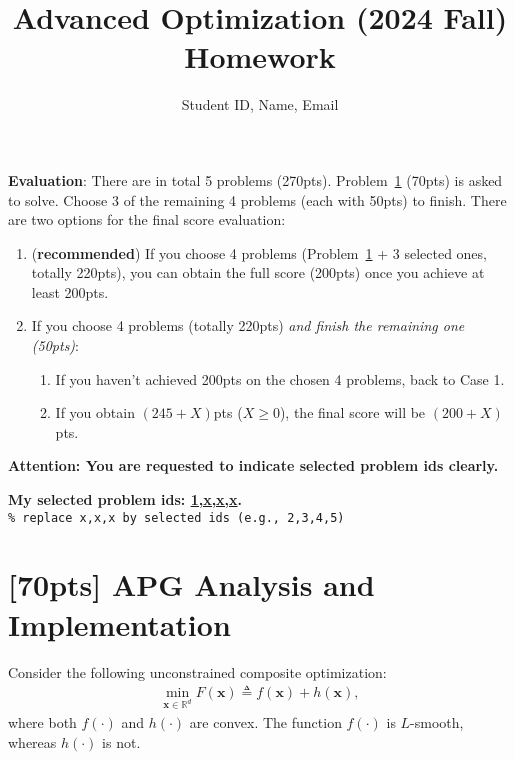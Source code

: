 \documentclass[a4paper]{article}
\numberwithin{equation}{section}
\theoremstyle{definition}
\theoremstyle{definition}
\def \x {\textbf{x}}
\newcommand\mychoice[1]{\textbf{My selected problem ids: \underline{1,#1}.}}
\begin{document}
\title{\textbf{Advanced Optimization (2024 Fall)\\
Homework}}
\author{Student ID, Name, Email}
\maketitle

\begin{tcolorbox}
\textbf{Evaluation}: There are in total 5 problems (270pts). Problem~\ref{sec:APG} (70pts) is asked to solve. Choose 3 of the remaining 4 problems (each with 50pts) to finish. There are two options for the final score evaluation:
\begin{enumerate}
  \item (\textbf{recommended}) If you choose 4 problems (Problem~\ref{sec:APG} + 3 selected ones, totally 220pts), you can obtain the full score (200pts) once you achieve at least 200pts.
  \item If you choose 4 problems (totally 220pts) \emph{and finish the remaining one (50pts)}:
    \begin{enumerate}
      \item If you haven't achieved 200pts on the chosen 4 problems, back to Case 1.
      \item If you obtain $(245+X)$pts ($X \ge 0$), the final score will be $(200+X)$pts.
    \end{enumerate}
\end{enumerate}

\begin{center}
  \textbf{Attention: You are requested to indicate selected problem ids clearly.} 

  {\color{red}\mychoice{x,x,x}}  \\
  \texttt{\% replace x,x,x by selected ids (e.g., 2,3,4,5)}
\end{center}
\end{tcolorbox}



\newpage
\section{[70pts] APG Analysis and Implementation}
\label{sec:APG}
Consider the following unconstrained composite optimization:
\begin{align*}
  \min_{\x \in \mathbb{R}^d} F(\x) \triangleq f(\x) + h(\x),
\end{align*}
where both $f(\cdot)$ and $h(\cdot)$ are convex. The function $f(\cdot)$ is $L$-smooth, whereas $h(\cdot)$ is not.
\end{document}
